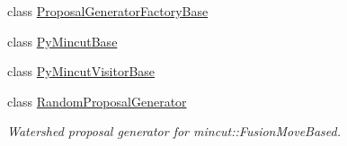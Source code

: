 \begin{DoxyCompactItemize}
\item 
class \hyperlink{classnifty_1_1graph_1_1optimization_1_1mincut_1_1ProposalGeneratorFactoryBase}{Proposal\+Generator\+Factory\+Base}
\item 
class \hyperlink{classnifty_1_1graph_1_1optimization_1_1mincut_1_1PyMincutBase}{Py\+Mincut\+Base}
\item 
class \hyperlink{classnifty_1_1graph_1_1optimization_1_1mincut_1_1PyMincutVisitorBase}{Py\+Mincut\+Visitor\+Base}
\item 
class \hyperlink{classnifty_1_1graph_1_1optimization_1_1mincut_1_1RandomProposalGenerator}{Random\+Proposal\+Generator}
\begin{DoxyCompactList}\small\item\em Watershed proposal generator for mincut\+::\+Fusion\+Move\+Based. \end{DoxyCompactList}\end{DoxyCompactItemize}

